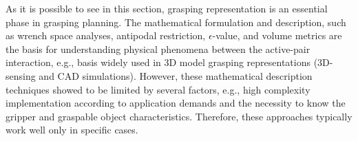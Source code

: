 







As it is possible to see in this section, grasping representation is an essential phase in grasping planning. The mathematical formulation and description, such as wrench space analyses, antipodal restriction, $\epsilon$-value, and volume metrics are the basis for understanding physical phenomena between the active-pair interaction, e.g., basis widely used in 3D model grasping representations (3D-sensing and CAD simulations). However, these mathematical description techniques showed to be limited by several factors, e.g., high complexity implementation according to application demands and the necessity to know the gripper and graspable object characteristics. Therefore, these approaches typically work well only in specific cases.  

